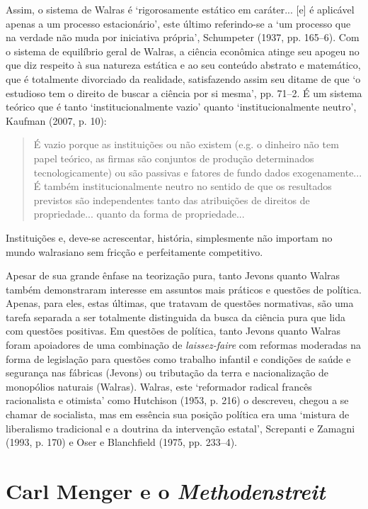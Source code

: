 \documentclass[12pt]{article}
\begin{document}
Assim, o sistema de Walras é ‘rigorosamente estático em caráter... [e] é aplicável apenas a um processo estacionário’, este último referindo-se a ‘um processo que na verdade não muda por iniciativa própria’, Schumpeter (1937, pp. 165–6). Com o sistema de equilíbrio geral de Walras, a ciência econômica atinge seu apogeu no que diz respeito à sua natureza estática e ao seu conteúdo abstrato e matemático, que é totalmente divorciado da realidade, satisfazendo assim seu ditame de que ‘o estudioso tem o direito de buscar a ciência por si mesma’, pp. 71–2. É um sistema teórico que é tanto ‘institucionalmente vazio’ quanto ‘institucionalmente neutro’, Kaufman (2007, p. 10):

\begin{quote}
É vazio porque as instituições ou não existem (e.g. o dinheiro não tem papel teórico, as firmas são conjuntos de produção determinados tecnologicamente) ou são passivas e fatores de fundo dados exogenamente... É também institucionalmente neutro no sentido de que os resultados previstos são independentes tanto das atribuições de direitos de propriedade... quanto da forma de propriedade...
\end{quote}

Instituições e, deve-se acrescentar, história, simplesmente não importam no mundo walrasiano sem fricção e perfeitamente competitivo.

Apesar de sua grande ênfase na teorização pura, tanto Jevons quanto Walras também demonstraram interesse em assuntos mais práticos e questões de política. Apenas, para eles, estas últimas, que tratavam de questões normativas, são uma tarefa separada a ser totalmente distinguida da busca da ciência pura que lida com questões positivas. Em questões de política, tanto Jevons quanto Walras foram apoiadores de uma combinação de \textit{laissez-faire} com reformas moderadas na forma de legislação para questões como trabalho infantil e condições de saúde e segurança nas fábricas (Jevons) ou tributação da terra e nacionalização de monopólios naturais (Walras). Walras, este ‘reformador radical francês racionalista e otimista’ como Hutchison (1953, p. 216) o descreveu, chegou a se chamar de socialista, mas em essência sua posição política era uma ‘mistura de liberalismo tradicional e a doutrina da intervenção estatal’, Screpanti e Zamagni (1993, p. 170) e Oser e Blanchfield (1975, pp. 233–4).

\section{Carl Menger e o \textit{Methodenstreit}}
\end{document}
